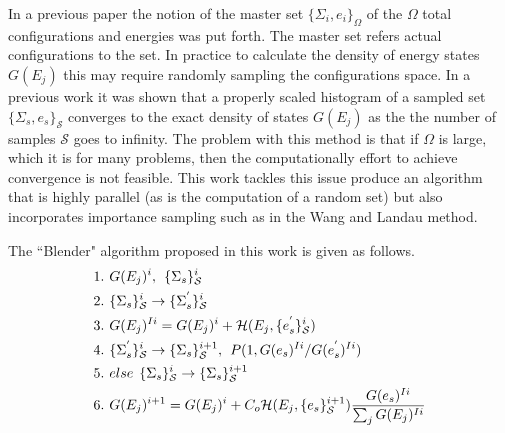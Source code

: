 \documentclass[twocolumn]{article}
\begin{document}
In a previous paper the notion of the master set $\{ \Sigma_i, e_i \}_\Omega $ of the $\Omega$ total configurations and energies was put forth. The master set refers actual configurations to the set. In practice to calculate the density of energy states $G(E_j)$ this may require randomly sampling the configurations space.  In a previous work it was shown that a properly scaled histogram of a sampled set $\{ \Sigma_s, e_s \}_\mathcal{S}$ converges to the exact density of states $G(E_j)$ as the the number of samples $\mathcal{S}$ goes to infinity. The problem with this method is that if $\Omega$ is large, which it is for many problems,  then the computationally effort to achieve convergence is not feasible.  This work tackles this issue produce an algorithm that is highly parallel (as is the computation of a random set) but also incorporates importance sampling such as in the Wang and Landau method.

The ``Blender" algorithm proposed in this work  is given as follows. \\
\begin{equation}
\begin{split}
&1.\hspace{0.125cm} G(E_j)^i ,\hspace{0.15cm}  \{\Sigma_{s}\}_{\mathcal{S}}^i\\
&2. \hspace{0.125cm}\{\Sigma_{s}\}_{\mathcal{S}}^i \rightarrow  \{\Sigma_{s}^{'}\}_{\mathcal{S}}^i\\
&3. \hspace{0.125cm}G(E_j)^{Ii} = G(E_j)^i + \mathcal{H}(E_j, \{e_{s}^{'}\}_{\mathcal{S}}^i) \\
&4. \hspace{0.125cm}\{\Sigma_{s}^{'}\}_{\mathcal{S}}^i \rightarrow \{\Sigma_{s}\}_{\mathcal{S}}^{i+1}, \hspace{0.15cm} P(1, G(e_s)^{Ii}/G(e_s^{'})^{Ii})\\
&5. \hspace{0.125cm}else  \hspace{0.15cm} \{\Sigma_{s}\}_{\mathcal{S}}^i \rightarrow \{\Sigma_{s}\}_{\mathcal{S}}^{i+1}\\
&6. \hspace{0.125cm} G(E_j)^{i+1} = G(E_j)^{i} + C_o\mathcal{H}(E_j, \{e_s\}_{\mathcal{S}}^{i+1})\frac{G(e_s)^{Ii}}{\sum_j G(E_j)^{Ii} }
\end{split}
\end{equation}
\end{document}
